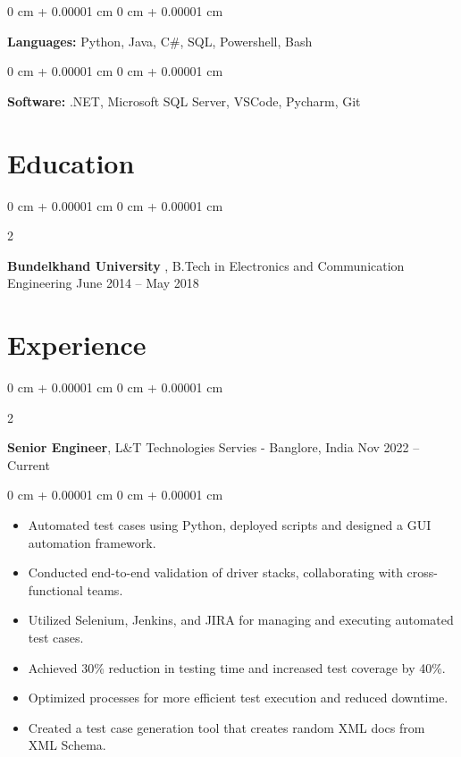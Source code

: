 \documentclass[10pt, letterpaper]{article}
\newenvironment{highlights}{
    \begin{itemize}[
        topsep=0.10 cm,
        parsep=0.10 cm,
        partopsep=0pt,
        itemsep=0pt,
        leftmargin=0 cm + 10pt
    ]
}{
    \end{itemize}
} %
\newenvironment{onecolentry}{
    \begin{adjustwidth}{
        0 cm + 0.00001 cm
    }{
        0 cm + 0.00001 cm
    }
}{
    \end{adjustwidth}
} %
\newenvironment{twocolentry}[2][]{
    \onecolentry
    \def\secondColumn{#2}
    \setcolumnwidth{\fill, 4.5 cm}
    \begin{paracol}{2}
}{
    \switchcolumn \raggedleft \secondColumn
    \end{paracol}
    \endonecolentry
} %
\begin{document}
        \begin{onecolentry}
            \textbf{Languages:} Python, Java, C\#, SQL, Powershell, Bash
        \end{onecolentry}

        \vspace{0.2 cm}

        \begin{onecolentry}
            \textbf{Software:} .NET, Microsoft SQL Server, VSCode, Pycharm, Git
        \end{onecolentry}

    \section{Education}



        
        \begin{twocolentry}{
            June 2014 – May 2018
        }
            \textbf{Bundelkhand University }, B.Tech in Electronics and Communication Engineering\end{twocolentry}

        \vspace{0.1 cm}
     
    \section{Experience}

        \begin{twocolentry}{
            Nov 2022 – Current
        }
            \textbf{Senior Engineer}, L\&T Technologies Servies - Banglore, India\end{twocolentry}

        \vspace{0.10 cm}
        \begin{onecolentry}
            \begin{highlights}
                \item Automated test cases using Python, deployed scripts and designed a GUI automation framework.
                \item Conducted end-to-end validation of driver stacks, collaborating with cross-functional teams.
                \item Utilized Selenium, Jenkins, and JIRA for managing and executing automated test cases.
                \item Achieved 30\% reduction in testing time and increased test coverage by 40\%.
                \item Optimized processes for more efficient test execution and reduced downtime.
                \item Created a test case generation tool that creates random XML docs from XML Schema.
            \end{highlights}
        \end{onecolentry}
\end{document}
